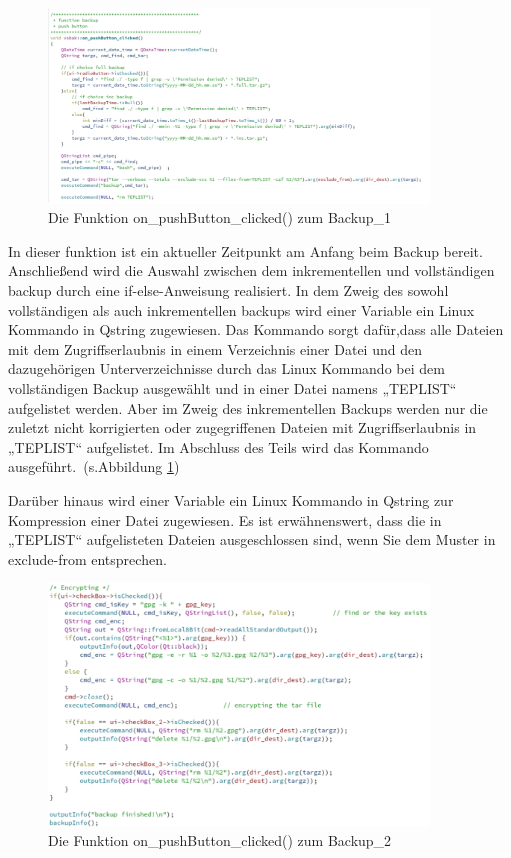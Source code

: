 \begin{figure}[h!]
	\centering
	\includegraphics[width=0.9\textwidth]{bilder/code_backup_1.png}
	\caption{ Die Funktion on\_pushButton\_clicked() zum Backup\_1 }
	\label{Abbildung_22}
\end{figure}

In dieser funktion ist ein aktueller Zeitpunkt am Anfang beim Backup bereit. Anschließend wird die Auswahl zwischen dem inkrementellen und vollständigen backup durch eine if-else-Anweisung realisiert. In dem Zweig des sowohl vollständigen als auch inkrementellen backups wird einer Variable ein Linux Kommando in Qstring zugewiesen. Das Kommando sorgt dafür,dass alle Dateien mit dem Zugriffserlaubnis in einem Verzeichnis einer Datei und den dazugehörigen Unterverzeichnisse durch das Linux Kommando bei dem vollständigen Backup ausgewählt und in einer Datei namens „TEPLIST“ aufgelistet werden. Aber im Zweig des inkrementellen Backups werden nur die zuletzt nicht korrigierten oder zugegriffenen Dateien mit Zugriffserlaubnis in „TEPLIST“ aufgelistet. Im Abschluss des Teils wird das Kommando ausgeführt. (s.Abbildung \ref{Abbildung_22})
\par Darüber hinaus wird einer Variable ein Linux Kommando in Qstring zur Kompression einer Datei zugewiesen. Es ist erwähnenswert, dass die in „TEPLIST“ aufgelisteten Dateien ausgeschlossen sind, wenn Sie dem Muster in exclude-from entsprechen. 

\begin{figure}[h!]
	\centering
	\includegraphics[width=0.9\textwidth]{bilder/code_backup_2.png}
	\caption{ Die Funktion on\_pushButton\_clicked() zum Backup\_2 }
	\label{Abbildung_23}
\end{figure}


